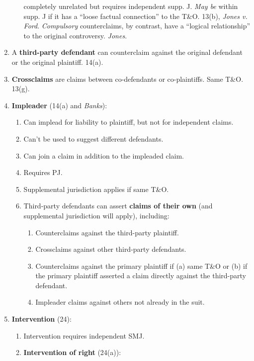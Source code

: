 \begin{enumerate}
\begin{enumerate}
        completely unrelated but requires independent supp. J. \emph{May be} 
        within supp. J if it has a ``loose factual connection'' to the T\&O.  
        13(b), \emph{Jones v. Ford}. \emph{Compulsory} counterclaims, by 
        contrast, have a ``logical relationship'' to the original controversy. 
        \emph{Jones}.
    \end{enumerate}
    \item A \textbf{third-party defendant} can counterclaim against the 
    original defendant or the original plaintiff. 14(a).
    \item \textbf{Crossclaims} are claims between co-defendants or 
    co-plaintiffs. Same T\&O. 13(g).
    \item \textbf{Impleader} (14(a) and \emph{Banks}):
    \begin{enumerate}
        \item Can implead for liability to plaintiff, but not for independent 
        claims.
        \item Can't be used to suggest different defendants.
        \item Can join a claim in addition to the impleaded claim.
        \item Requires PJ.
        \item Supplemental jurisdiction applies if same T\&O.
        \item Third-party defendants can assert \textbf{claims of their own} 
        (and supplemental jurisdiction will apply), including:
        \begin{enumerate}
            \item Counterclaims against the third-party plaintiff.
            \item Crossclaims against other third-party defendants.
            \item Counterclaims against the primary plaintiff if (a) same T\&O 
            or (b) if the primary plaintiff asserted a claim directly against 
            the third-party defendant.
            \item Impleader claims against others not already in the suit.
        \end{enumerate}
    \end{enumerate}
    \item \textbf{Intervention} (24):
    \begin{enumerate}
        \item Intervention requires independent SMJ.
        \item \textbf{Intervention of right} (24(a)):

\end{enumerate}
\end{enumerate}
